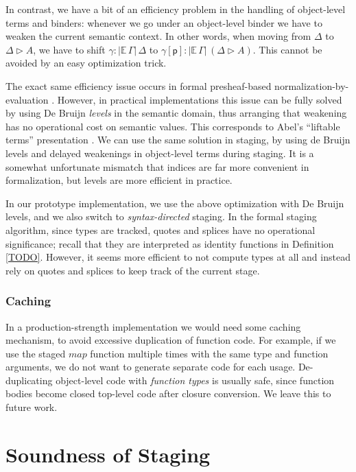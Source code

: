 \documentclass[acmsmall]{acmart}
\newcommand{\mit}[1]{\mathit{#1}}
\newcommand{\mbb}[1]{\mathbb{#1}}
\newcommand{\ext}{\triangleright}
\newcommand{\p}{\mathsf{p}}
\newcommand{\ev}{\mbb{E}}
\theoremstyle{remark}
\begin{document}
In contrast, we have a bit of an efficiency problem in the handling of object-level
terms and binders: whenever we go under an object-level binder we have to weaken
the current semantic context. In other words, when moving from $\Delta$ to
$\Delta \ext A$, we have to shift $\gamma : |\ev\,\Gamma|\,\Delta$ to
$\gamma[\p] : |\ev\,\Gamma|\,(\Delta \ext A)$. This cannot be avoided by an easy
optimization trick.

The exact same efficiency issue occurs in formal presheaf-based
normalization-by-evaluation \cite{TODO}. However, in practical implementations
\cite{TODO} this issue can be fully solved by using De Bruijn \emph{levels} in
the semantic domain, thus arranging that weakening has no operational cost on
semantic values. This corresponds to Abel's ``liftable terms'' presentation
\cite{TODO}. We can use the same solution in staging, by using de Bruijn levels
and delayed weakenings in object-level terms during staging. It is a somewhat
unfortunate mismatch that indices are far more convenient in formalization, but
levels are more efficient in practice.

In our prototype implementation, we use the above optimization with De Bruijn
levels, and we also switch to \emph{syntax-directed} staging. In the formal
staging algorithm, since types are tracked, quotes and splices have no
operational significance; recall that they are interpreted as identity functions
in Definition \ref{TODO}. However, it seems more efficient to not compute types
at all and instead rely on quotes and splices to keep track of the current
stage.

\subsubsection{Caching} In a production-strength implementation we would need some
caching mechanism, to avoid excessive duplication of function code. For example,
if we use the staged $\mit{map}$ function multiple times with the same type and
function arguments, we do not want to generate separate code for each
usage. De-duplicating object-level code with \emph{function types} is
usually safe, since function bodies become closed top-level code after closure
conversion. We leave this to future work.

\section{Soundness of Staging}\label{sec:soundness}
\end{document}
